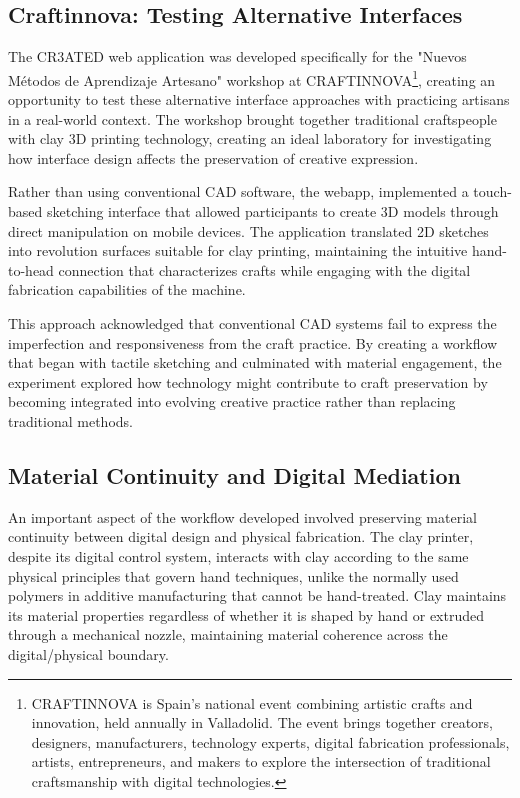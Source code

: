 \subsection{Craftinnova: Testing Alternative Interfaces}

The CR3ATED web application was developed specifically for the "Nuevos Métodos de Aprendizaje Artesano" workshop at CRAFTINNOVA\footnote{CRAFTINNOVA is Spain's national event combining artistic crafts and innovation, held annually in Valladolid. The event brings together creators, designers, manufacturers, technology experts, digital fabrication professionals, artists, entrepreneurs, and makers to explore the intersection of traditional craftsmanship with digital technologies.}, creating an opportunity to test these alternative interface approaches with practicing artisans in a real-world context. The workshop brought together traditional craftspeople with clay 3D printing technology, creating an ideal laboratory for investigating how interface design affects the preservation of creative expression.

\vspace{0.5cm}

Rather than using conventional CAD software, the webapp, implemented a touch-based sketching interface that allowed participants to create 3D models through direct manipulation on mobile devices. The application translated 2D sketches into revolution surfaces suitable for clay printing, maintaining the intuitive hand-to-head connection that characterizes crafts while engaging with the digital fabrication capabilities of the machine.

\vspace{0.5cm}

This approach acknowledged that conventional CAD systems fail to express the imperfection and responsiveness from the craft practice. By creating a workflow that began with tactile sketching and culminated with material engagement, the experiment explored how technology might contribute to craft preservation by becoming integrated into evolving creative practice rather than replacing traditional methods.

\subsection{Material Continuity and Digital Mediation}

An important aspect of the workflow developed involved preserving material continuity between digital design and physical fabrication. The clay printer, despite its digital control system, interacts with clay according to the same physical principles that govern hand techniques, unlike the normally used polymers in additive manufacturing that cannot be hand-treated. Clay maintains its material properties regardless of whether it is shaped by hand or extruded through a mechanical nozzle, maintaining material coherence across the digital/physical boundary.

